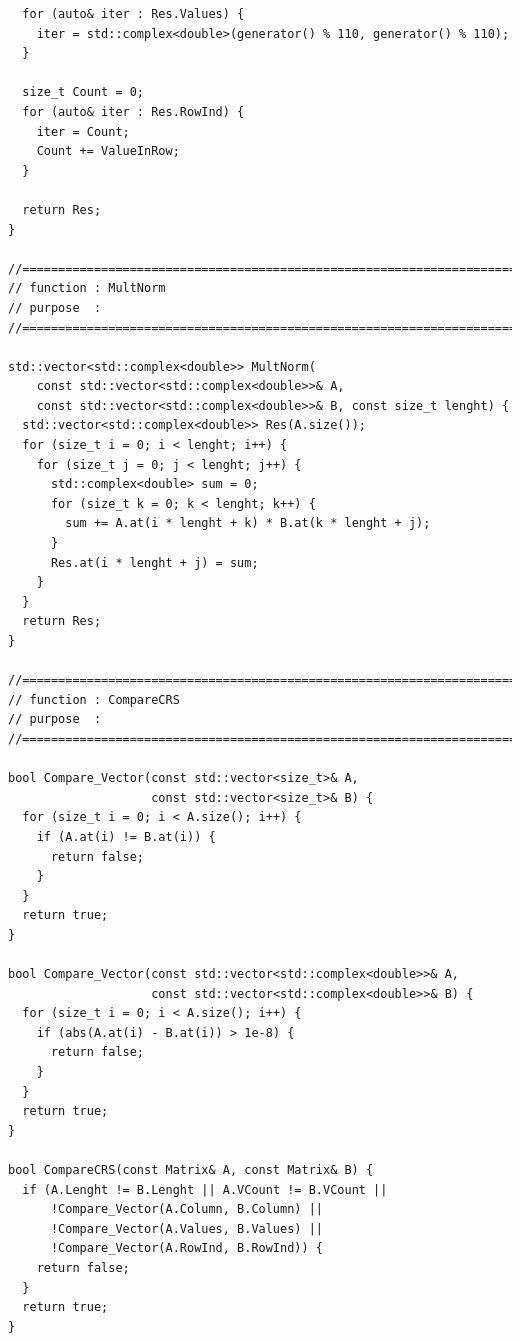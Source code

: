 \documentclass{report}
\begin{document}
\begin{lstlisting}
  for (auto& iter : Res.Values) {
    iter = std::complex<double>(generator() % 110, generator() % 110);
  }

  size_t Count = 0;
  for (auto& iter : Res.RowInd) {
    iter = Count;
    Count += ValueInRow;
  }

  return Res;
}

//=======================================================================
// function : MultNorm
// purpose  :
//=======================================================================

std::vector<std::complex<double>> MultNorm(
    const std::vector<std::complex<double>>& A,
    const std::vector<std::complex<double>>& B, const size_t lenght) {
  std::vector<std::complex<double>> Res(A.size());
  for (size_t i = 0; i < lenght; i++) {
    for (size_t j = 0; j < lenght; j++) {
      std::complex<double> sum = 0;
      for (size_t k = 0; k < lenght; k++) {
        sum += A.at(i * lenght + k) * B.at(k * lenght + j);
      }
      Res.at(i * lenght + j) = sum;
    }
  }
  return Res;
}

//=======================================================================
// function : CompareCRS
// purpose  :
//=======================================================================

bool Compare_Vector(const std::vector<size_t>& A,
                    const std::vector<size_t>& B) {
  for (size_t i = 0; i < A.size(); i++) {
    if (A.at(i) != B.at(i)) {
      return false;
    }
  }
  return true;
}

bool Compare_Vector(const std::vector<std::complex<double>>& A,
                    const std::vector<std::complex<double>>& B) {
  for (size_t i = 0; i < A.size(); i++) {
    if (abs(A.at(i) - B.at(i)) > 1e-8) {
      return false;
    }
  }
  return true;
}

bool CompareCRS(const Matrix& A, const Matrix& B) {
  if (A.Lenght != B.Lenght || A.VCount != B.VCount ||
      !Compare_Vector(A.Column, B.Column) ||
      !Compare_Vector(A.Values, B.Values) ||
      !Compare_Vector(A.RowInd, B.RowInd)) {
    return false;
  }
  return true;
}
\end{lstlisting}
\newpage
\end{document}
